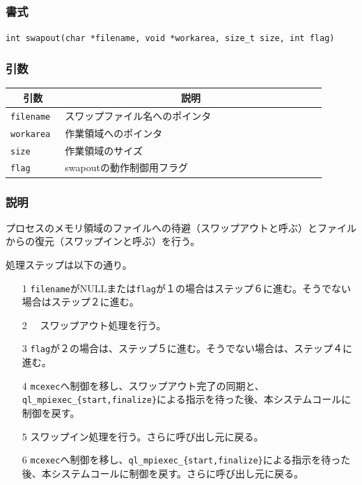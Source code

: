 \documentclass[twoside,11pt,fleqn]{book}
\begin{document}
\section{}
\subsection{}
\subsubsection*{書式}{\quad} \texttt{int swapout(char *filename, void *workarea, size\_t size, int flag)}
\subsubsection*{引数}{\quad}
\begin{table}[!ht]
\footnotesize
\begin{tabular}{|p{0.15\linewidth}|p{0.75\linewidth}|} \hline
\multicolumn{1}{|c}{\textbf{引数}}&\multicolumn{1}{|c|}{\textbf{説明}}\\ \hline \hline
\texttt{filename}&スワップファイル名へのポインタ\\ \hline
\texttt{workarea}&作業領域へのポインタ\\ \hline
\texttt{size}&作業領域のサイズ\\ \hline
\texttt{flag}&swapoutの動作制御用フラグ \\ \hline
\end{tabular}
\vspace{-0em}
\end{table}
\subsubsection*{説明}{\quad}
プロセスのメモリ領域のファイルへの待避（スワップアウトと呼ぶ）とファイルからの復元（スワップインと呼ぶ）を行う。

処理ステップは以下の通り。
\begin{itemize}
\item[1] \texttt{filename}がNULLまたは\texttt{flag}が１の場合はステップ６に進む。そうでない場合はステップ２に進む。
\item[2]　スワップアウト処理を行う。
\item[3] \texttt{flag}が２の場合は、ステップ５に進む。そうでない場合は、ステップ４に進む。
\item[4] \texttt{mcexec}へ制御を移し、スワップアウト完了の同期と、\texttt{ql\_mpiexec\_\{start,finalize\}}による指示を待った後、本システムコールに制御を戻す。
\item[5]  スワップイン処理を行う。さらに呼び出し元に戻る。
\item[6] \texttt{mcexec}へ制御を移し、\texttt{ql\_mpiexec\_\{start,finalize\}}による指示を待った後、本システムコールに制御を戻す。さらに呼び出し元に戻る。
\end{itemize}
\FloatBarrier
\end{document}
